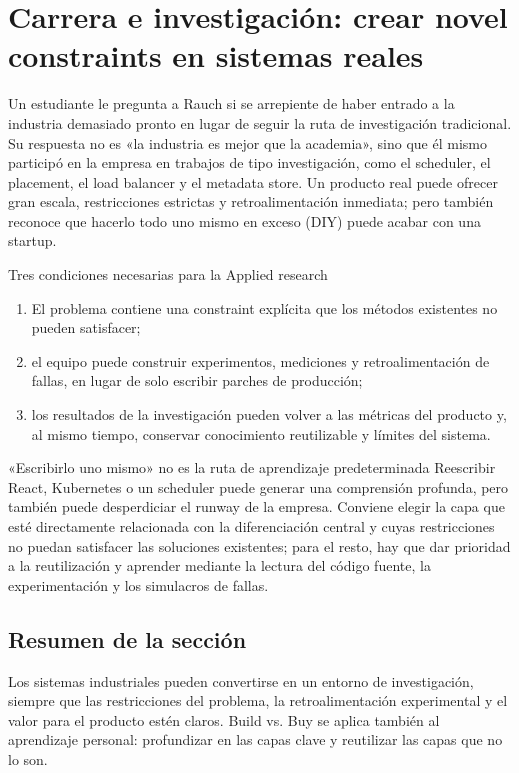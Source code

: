 \section{Carrera e investigación: crear novel constraints en sistemas reales}

Un estudiante le pregunta a Rauch si se arrepiente de haber entrado a la industria demasiado pronto en lugar de seguir la ruta de investigación tradicional. Su respuesta no es «la industria es mejor que la academia», sino que él mismo participó en la empresa en trabajos de tipo investigación, como el scheduler, el placement, el load balancer y el metadata store. Un producto real puede ofrecer gran escala, restricciones estrictas y retroalimentación inmediata; pero también reconoce que hacerlo todo uno mismo en exceso (DIY) puede acabar con una startup.

\begin{knowledgebox}{Tres condiciones necesarias para la Applied research}
\begin{enumerate}
  \item El problema contiene una constraint explícita que los métodos existentes no pueden satisfacer;
  \item el equipo puede construir experimentos, mediciones y retroalimentación de fallas, en lugar de solo escribir parches de producción;
  \item los resultados de la investigación pueden volver a las métricas del producto y, al mismo tiempo, conservar conocimiento reutilizable y límites del sistema.
\end{enumerate}
\end{knowledgebox}

\begin{warningbox}{«Escribirlo uno mismo» no es la ruta de aprendizaje predeterminada}
Reescribir React, Kubernetes o un scheduler puede generar una comprensión profunda, pero también puede desperdiciar el runway de la empresa. Conviene elegir la capa que esté directamente relacionada con la diferenciación central y cuyas restricciones no puedan satisfacer las soluciones existentes; para el resto, hay que dar prioridad a la reutilización y aprender mediante la lectura del código fuente, la experimentación y los simulacros de fallas.
\end{warningbox}


\subsection{Resumen de la sección}

Los sistemas industriales pueden convertirse en un entorno de investigación, siempre que las restricciones del problema, la retroalimentación experimental y el valor para el producto estén claros. Build vs. Buy se aplica también al aprendizaje personal: profundizar en las capas clave y reutilizar las capas que no lo son.
